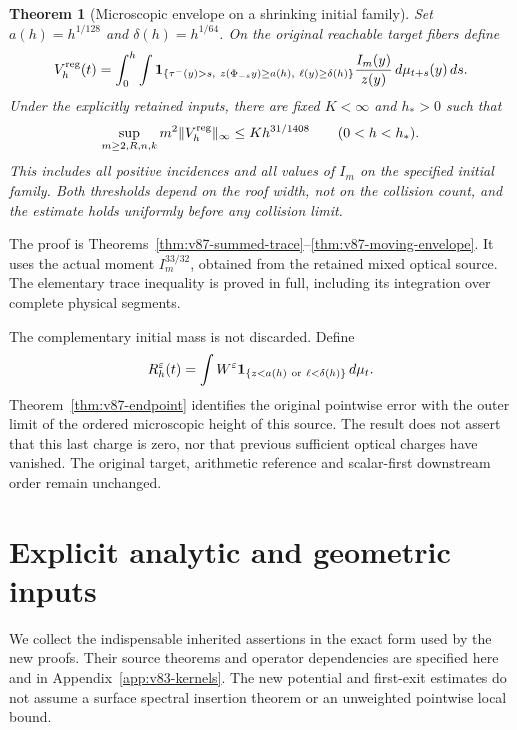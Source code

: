 \documentclass[11pt,reqno]{amsart}
\numberwithin{equation}{section}
\newtheorem{theorem}{Theorem}[section]
\theoremstyle{definition}\newtheorem{definition}[theorem]{Definition}
\theoremstyle{remark}\newtheorem{remark}[theorem]{Remark}
\theoremstyle{definition}\newtheorem{inputstatement}[theorem]{Input statement}
\begin{document}
\begin{theorem}[Microscopic envelope on a shrinking initial family]
\label{thm:v87-main}
Set $a(h)=h^{1/128}$ and $\delta(h)=h^{1/64}$. On the original
reachable target fibers define
\[
 V_h^{\rm reg}(t)=\int_0^h\int
  \one_{\{\tau^-(y)>s,\ z(\Phi_{-s}y)\ge a(h),\ \ell(y)\ge\delta(h)\}}
                      \frac{I_m(y)}{z(y)}\,d\mu_{t+s}(y)\,ds.
\]
Under the explicitly retained inputs, there are fixed $K<\infty$
and $h_*>0$ such that
\begin{equation}\label{eq:v87-main-envelope}
 \sup_{m\ge2,R,n,k}m^2\|V_h^{\rm reg}\|_\infty
                              \le Kh^{31/1408}\qquad(0<h<h_*).
\end{equation}
This includes all positive incidences and all values of $I_m$ on
the specified initial family. Both thresholds depend on the roof
width, not on the collision count, and the estimate holds uniformly
before any collision limit.
\end{theorem}
The proof is Theorems~\ref{thm:v87-summed-trace}--\ref{thm:v87-moving-envelope}.
It uses the actual moment $I_m^{33/32}$, obtained from the retained
mixed optical source. The elementary trace inequality is proved in
full, including its integration over complete physical segments.

The complementary initial mass is not discarded. Define
\[
 R_h^\varepsilon(t)=\int W^\varepsilon
            \one_{\{z<a(h)\ \mathrm{or}\ \ell<\delta(h)\}}\,d\mu_t.
\]
Theorem~\ref{thm:v87-endpoint} identifies the original pointwise error
with the outer limit of the ordered microscopic height of this source.
The result does not assert that this last charge is zero, nor that
previous sufficient optical charges have vanished. The original
target, arithmetic reference and scalar-first downstream order remain
unchanged.

\section{Explicit analytic and geometric inputs}
We collect the indispensable inherited assertions in the exact form
used by the new proofs. Their source theorems and operator dependencies
are specified here and in Appendix~\ref{app:v83-kernels}. The new
potential and first-exit estimates do not assume a surface spectral
insertion theorem or an unweighted pointwise local bound.
\end{document}
